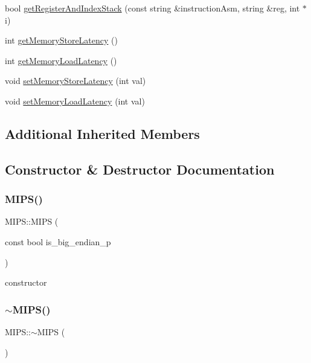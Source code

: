 \begin{DoxyCompactItemize}
bool \hyperlink{classMIPS_a32b86b25f6547ba12fc2a8bc348b4aad}{get\+Register\+And\+Index\+Stack} (const string \&instruction\+Asm, string \&reg, int $\ast$i)
\item 
int \hyperlink{classMIPS_a4a7d7555f5e7fb53cf39be02f6f27fc5}{get\+Memory\+Store\+Latency} ()
\item 
int \hyperlink{classMIPS_a9b69a65d964ddba7bcc00d6219262740}{get\+Memory\+Load\+Latency} ()
\item 
void \hyperlink{classMIPS_a2c58b6b1405f9fa38305e2b064ed83b8}{set\+Memory\+Store\+Latency} (int val)
\item 
void \hyperlink{classMIPS_ab6fbe5813d16f00c5a66c28211b4eec5}{set\+Memory\+Load\+Latency} (int val)
\end{DoxyCompactItemize}
\subsection*{Additional Inherited Members}


\subsection{Constructor \& Destructor Documentation}
\mbox{\label{classMIPS_a758824a40d11a4d0003e781d0e8ea51c}} 
\subsubsection{\texorpdfstring{M\+I\+P\+S()}{MIPS()}}
{\footnotesize\ttfamily M\+I\+P\+S\+::\+M\+I\+PS (\begin{DoxyParamCaption}\item[{const bool}]{is\+\_\+big\+\_\+endian\+\_\+p }\end{DoxyParamCaption})}

constructor \mbox{\label{classMIPS_a71b83e8e05e3a5d454faa9fe02a75fe7}} 
\subsubsection{\texorpdfstring{$\sim$\+M\+I\+P\+S()}{~MIPS()}}
{\footnotesize\ttfamily M\+I\+P\+S\+::$\sim$\+M\+I\+PS (\begin{DoxyParamCaption}{ }\end{DoxyParamCaption})}


